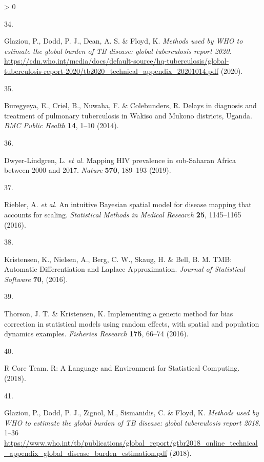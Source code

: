 \documentclass[
]{article}
\newlength{\cslhangindent}
\newlength{\csllabelwidth}
\newenvironment{CSLReferences}[2] %
 {%
  \setlength{\parindent}{0pt}
  \ifodd #1 \everypar{\setlength{\hangindent}{\cslhangindent}}\ignorespaces\fi
  \ifnum #2 > 0
  \setlength{\parskip}{#2\baselineskip}
  \fi
 }%
 {}
\newcommand{\CSLLeftMargin}[1]{\parbox[t]{\csllabelwidth}{#1}}
\newcommand{\CSLRightInline}[1]{\parbox[t]{\linewidth - \csllabelwidth}{#1}\break}
\begin{document}
\begin{CSLReferences}{0}{0}
\leavevmode\hypertarget{ref-Glaziou2020}{}%
\CSLLeftMargin{34. }
\CSLRightInline{Glaziou, P., Dodd, P. J., Dean, A. S. \& Floyd, K. \emph{{Methods used by WHO to estimate the global burden of TB disease: global tuberculosis report 2020}}. \url{https://cdn.who.int/media/docs/default-source/hq-tuberculosis/global-tuberculosis-report-2020/tb2020_technical_appendix_20201014.pdf} (2020).}

\leavevmode\hypertarget{ref-Buregyeya2014}{}%
\CSLLeftMargin{35. }
\CSLRightInline{Buregyeya, E., Criel, B., Nuwaha, F. \& Colebunders, R. {Delays in diagnosis and treatment of pulmonary tuberculosis in Wakiso and Mukono districts, Uganda}. \emph{BMC Public Health} \textbf{14}, 1--10 (2014).}

\leavevmode\hypertarget{ref-Dwyer-Lindgren2019}{}%
\CSLLeftMargin{36. }
\CSLRightInline{Dwyer-Lindgren, L. \emph{et al.} {Mapping HIV prevalence in sub-Saharan Africa between 2000 and 2017}. \emph{Nature} \textbf{570}, 189--193 (2019).}

\leavevmode\hypertarget{ref-Riebler2016}{}%
\CSLLeftMargin{37. }
\CSLRightInline{Riebler, A. \emph{et al.} {An intuitive Bayesian spatial model for disease mapping that accounts for scaling}. \emph{Statistical Methods in Medical Research} \textbf{25}, 1145--1165 (2016).}

\leavevmode\hypertarget{ref-Kristensen2016}{}%
\CSLLeftMargin{38. }
\CSLRightInline{Kristensen, K., Nielsen, A., Berg, C. W., Skaug, H. \& Bell, B. M. {TMB: Automatic Differentiation and Laplace Approximation}. \emph{Journal of Statistical Software} \textbf{70}, (2016).}

\leavevmode\hypertarget{ref-Thorson2016}{}%
\CSLLeftMargin{39. }
\CSLRightInline{Thorson, J. T. \& Kristensen, K. {Implementing a generic method for bias correction in statistical models using random effects, with spatial and population dynamics examples}. \emph{Fisheries Research} \textbf{175}, 66--74 (2016).}

\leavevmode\hypertarget{ref-RCoreTeam2018}{}%
\CSLLeftMargin{40. }
\CSLRightInline{R Core Team. {R: A Language and Environment for Statistical Computing}. (2018).}

\leavevmode\hypertarget{ref-Glaziou2018}{}%
\CSLLeftMargin{41. }
\CSLRightInline{Glaziou, P., Dodd, P. J., Zignol, M., Sismanidis, C. \& Floyd, K. \emph{{Methods used by WHO to estimate the global burden of TB disease: global tuberculosis report 2018}}. 1--36 \url{https://www.who.int/tb/publications/global_report/gtbr2018_online_technical_appendix_global_disease_burden_estimation.pdf} (2018).}


\end{CSLReferences}
\end{document}
